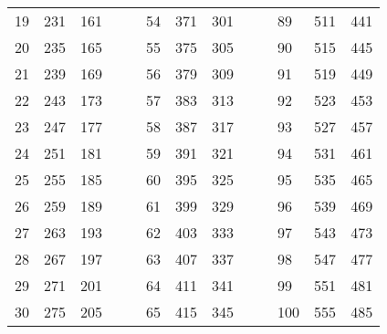 \begin{table}[!h]
\begin{tabular}{|l|l|l|ll|l|l|l|lllll}
		19 & 231 & 161 &  &  & 54 & 371 & 301 &  & \multicolumn{1}{l|}{} & \multicolumn{1}{l|}{89} & \multicolumn{1}{l|}{511} & \multicolumn{1}{l|}{441} \\ \cline{1-3} \cline{6-8} \cline{11-13} 
		20 & 235 & 165 &  &  & 55 & 375 & 305 &  & \multicolumn{1}{l|}{} & \multicolumn{1}{l|}{90} & \multicolumn{1}{l|}{515} & \multicolumn{1}{l|}{445} \\ \cline{1-3} \cline{6-8} \cline{11-13} 
		21 & 239 & 169 &  &  & 56 & 379 & 309 &  & \multicolumn{1}{l|}{} & \multicolumn{1}{l|}{91} & \multicolumn{1}{l|}{519} & \multicolumn{1}{l|}{449} \\ \cline{1-3} \cline{6-8} \cline{11-13} 
		22 & 243 & 173 &  &  & 57 & 383 & 313 &  & \multicolumn{1}{l|}{} & \multicolumn{1}{l|}{92} & \multicolumn{1}{l|}{523} & \multicolumn{1}{l|}{453} \\ \cline{1-3} \cline{6-8} \cline{11-13} 
		23 & 247 & 177 &  &  & 58 & 387 & 317 &  & \multicolumn{1}{l|}{} & \multicolumn{1}{l|}{93} & \multicolumn{1}{l|}{527} & \multicolumn{1}{l|}{457} \\ \cline{1-3} \cline{6-8} \cline{11-13} 
		24 & 251 & 181 &  &  & 59 & 391 & 321 &  & \multicolumn{1}{l|}{} & \multicolumn{1}{l|}{94} & \multicolumn{1}{l|}{531} & \multicolumn{1}{l|}{461} \\ \cline{1-3} \cline{6-8} \cline{11-13} 
		25 & 255 & 185 &  &  & 60 & 395 & 325 &  & \multicolumn{1}{l|}{} & \multicolumn{1}{l|}{95} & \multicolumn{1}{l|}{535} & \multicolumn{1}{l|}{465} \\ \cline{1-3} \cline{6-8} \cline{11-13} 
		26 & 259 & 189 &  &  & 61 & 399 & 329 &  & \multicolumn{1}{l|}{} & \multicolumn{1}{l|}{96} & \multicolumn{1}{l|}{539} & \multicolumn{1}{l|}{469} \\ \cline{1-3} \cline{6-8} \cline{11-13} 
		27 & 263 & 193 &  &  & 62 & 403 & 333 &  & \multicolumn{1}{l|}{} & \multicolumn{1}{l|}{97} & \multicolumn{1}{l|}{543} & \multicolumn{1}{l|}{473} \\ \cline{1-3} \cline{6-8} \cline{11-13} 
		28 & 267 & 197 &  &  & 63 & 407 & 337 &  & \multicolumn{1}{l|}{} & \multicolumn{1}{l|}{98} & \multicolumn{1}{l|}{547} & \multicolumn{1}{l|}{477} \\ \cline{1-3} \cline{6-8} \cline{11-13} 
		29 & 271 & 201 &  &  & 64 & 411 & 341 &  & \multicolumn{1}{l|}{} & \multicolumn{1}{l|}{99} & \multicolumn{1}{l|}{551} & \multicolumn{1}{l|}{481} \\ \cline{1-3} \cline{6-8} \cline{11-13} 
		30 & 275 & 205 &  &  & 65 & 415 & 345 &  & \multicolumn{1}{l|}{} & \multicolumn{1}{l|}{100} & \multicolumn{1}{l|}{555} & \multicolumn{1}{l|}{485} \\ \cline{1-3} \cline{6-8} \cline{11-13} 

\end{tabular}
\end{table}

